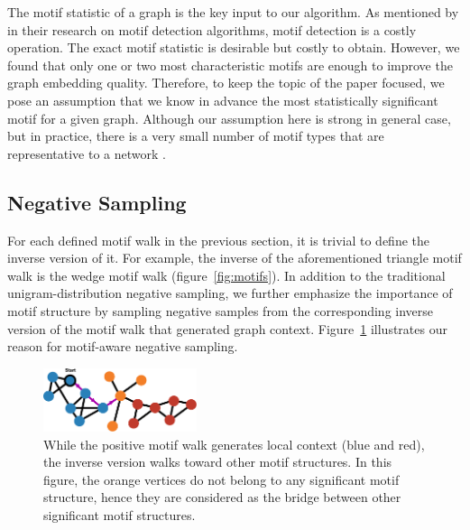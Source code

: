 \documentclass[letterpaper]{article}
\begin{document}
            The motif statistic of a graph is the key input to our algorithm. As mentioned by \citeauthor{motifdecrev} 
            in their research on motif detection algorithms, motif detection is a costly operation. The
            exact motif statistic is desirable but costly to obtain. However, we found that only one or 
            two most characteristic motifs are enough to improve the graph embedding quality. Therefore, 
            to keep the topic of the paper focused, we pose an assumption that we know in advance the most
            statistically significant motif for a given graph. Although our assumption here is strong
            in general case, but in practice, there is a very small number of motif types that are
            representative to a network \cite{juremotif,motifdecrev,comsocialnetwork}.

        \subsection{Negative Sampling}

            For each defined motif walk in the previous section, it is trivial to define the inverse version
            of it. For example, the inverse of the aforementioned triangle motif walk is the wedge motif
            walk (figure~\ref{fig:motifs}). In addition to the traditional unigram-distribution negative
            sampling, we further emphasize the importance of motif structure by sampling negative samples
            from the corresponding inverse version of the motif walk that generated graph context. 
            Figure~\ref{fig:mneg} illustrates our reason for motif-aware negative sampling.

            \begin{figure}
                \centering
                \includegraphics[width=0.4\textwidth]{fig6_mneg}
                \caption{While the positive motif walk generates local context (blue and red), the inverse version walks toward other motif structures. In this figure, the orange vertices do not belong to any significant motif structure, hence they are considered as the bridge between other significant motif structures.}
                \label{fig:mneg}
            \end{figure}
\end{document}
